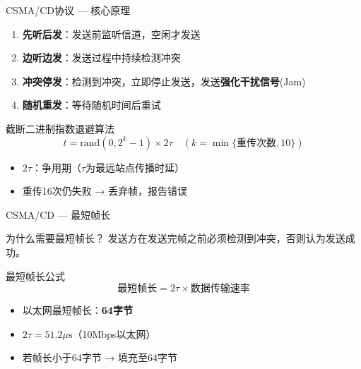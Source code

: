 \documentclass[10pt, aspectratio=169]{beamer}
\begin{document}
\begin{frame}{CSMA/CD协议 --- 核心原理}
    \begin{center}
    \end{center}
    \vspace{0.5em}
    \begin{enumerate}
        \item \textbf{先听后发}：发送前监听信道，空闲才发送
        \item \textbf{边听边发}：发送过程中持续检测冲突
        \item \textbf{冲突停发}：检测到冲突，立即停止发送，发送\textbf{强化干扰信号}(Jam)
        \item \textbf{随机重发}：等待随机时间后重试
    \end{enumerate}
    \vspace{0.5em}
    \begin{block}{截断二进制指数退避算法}
        \[
        t = \text{rand}(0, 2^k - 1) \times 2\tau \quad (k = \min\{\text{重传次数}, 10\})
        \]
        \begin{itemize}
            \item $2\tau$：争用期（$\tau$为最远站点传播时延）
            \item 重传16次仍失败 → 丢弃帧，报告错误
        \end{itemize}
    \end{block}
\end{frame}

\begin{frame}{CSMA/CD --- 最短帧长}
    \begin{block}{为什么需要最短帧长？}
        发送方在发送完帧之前必须检测到冲突，否则认为发送成功。
    \end{block}
    \vspace{0.5em}
    \begin{exampleblock}{最短帧长公式}
        \[
        \text{最短帧长} = 2\tau \times \text{数据传输速率}
        \]
    \end{exampleblock}
    \vspace{0.3em}
    \begin{itemize}
        \item 以太网最短帧长：\textbf{64字节}
        \item $2\tau = 51.2\mu\text{s}$（10Mbps以太网）
        \item 若帧长小于64字节 → 填充至64字节
    \end{itemize}
    \vspace{0.5em}
    \begin{center}
    \end{center}
\end{frame}
\end{document}
